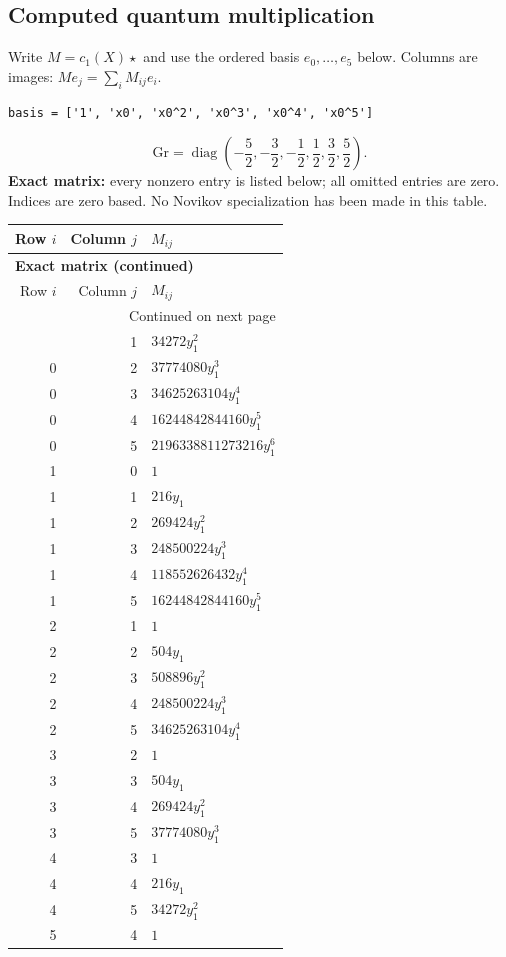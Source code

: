 \documentclass[10pt,a4paper]{article}
\begin{document}
\subsection*{Computed quantum multiplication}
Write $M=c_1(X)\star$ and use the ordered basis $e_0,\ldots,e_{5}$ below. Columns are images: $M e_j=\sum_i M_{ij}e_i$.
\begin{lstlisting}
basis = ['1', 'x0', 'x0^2', 'x0^3', 'x0^4', 'x0^5']
\end{lstlisting}
\[\mathrm{Gr}=\operatorname{diag}\!\left(- \frac{5}{2},- \frac{3}{2},- \frac{1}{2},\frac{1}{2},\frac{3}{2},\frac{5}{2}\right).\]
\textbf{Exact matrix:} every nonzero entry is listed below; all omitted entries are zero. Indices are zero based. No Novikov specialization has been made in this table.
{\small\setlength{\tabcolsep}{7pt}\begin{longtable}{rrp{125mm}}
\toprule Row $i$ & Column $j$ & $M_{ij}$\\\midrule\endfirsthead
\multicolumn{3}{l}{\textbf{Exact matrix (continued)}}\\
\toprule Row $i$ & Column $j$ & $M_{ij}$\\\midrule\endhead
\midrule\multicolumn{3}{r}{Continued on next page}\\\endfoot\bottomrule\endlastfoot
0 & 1 & $34272 y_{1}^{2}$\\
0 & 2 & $37774080 y_{1}^{3}$\\
0 & 3 & $34625263104 y_{1}^{4}$\\
0 & 4 & $16244842844160 y_{1}^{5}$\\
0 & 5 & $2196338811273216 y_{1}^{6}$\\
1 & 0 & $1$\\
1 & 1 & $216 y_{1}$\\
1 & 2 & $269424 y_{1}^{2}$\\
1 & 3 & $248500224 y_{1}^{3}$\\
1 & 4 & $118552626432 y_{1}^{4}$\\
1 & 5 & $16244842844160 y_{1}^{5}$\\
2 & 1 & $1$\\
2 & 2 & $504 y_{1}$\\
2 & 3 & $508896 y_{1}^{2}$\\
2 & 4 & $248500224 y_{1}^{3}$\\
2 & 5 & $34625263104 y_{1}^{4}$\\
3 & 2 & $1$\\
3 & 3 & $504 y_{1}$\\
3 & 4 & $269424 y_{1}^{2}$\\
3 & 5 & $37774080 y_{1}^{3}$\\
4 & 3 & $1$\\
4 & 4 & $216 y_{1}$\\
4 & 5 & $34272 y_{1}^{2}$\\
5 & 4 & $1$\\
\end{longtable}}
\end{document}
